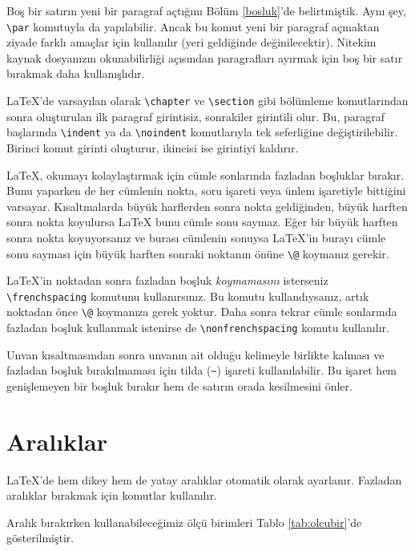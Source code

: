 \documentclass[
  10pt,
]{scrbook}
\theoremstyle{definition}
\theoremstyle{definition}
\theoremstyle{definition}
\theoremstyle{definition}
\theoremstyle{remark}
\begin{document}
Boş bir satırın yeni bir paragraf açtığını Bölüm \ref{bosluk}'de belirtmiştik. Aynı şey, \texttt{\textbackslash{}par} komutuyla da yapılabilir. Ancak bu komut yeni bir paragraf açmaktan ziyade farklı amaçlar için kullanılır (yeri geldiğinde değinilecektir). Nitekim kaynak dosyanızın okunabilirliği açısından paragrafları ayırmak için boş bir satır bırakmak daha kullanışlıdır.

LaTeX'de varsayılan olarak \texttt{\textbackslash{}chapter} ve \texttt{\textbackslash{}section} gibi bölümleme komutlarından sonra oluşturulan ilk paragraf girintisiz, sonrakiler girintili olur. Bu, paragraf başlarında \texttt{\textbackslash{}indent} ya da \texttt{\textbackslash{}noindent} komutlarıyla tek seferliğine değiştirilebilir. Birinci komut girinti oluşturur, ikincisi ise girintiyi kaldırır.

LaTeX, okumayı kolaylaştırmak için cümle sonlarında fazladan boşluklar bırakır. Bunu yaparken de her cümlenin nokta, soru işareti veya ünlem işaretiyle bittiğini varsayar. Kısaltmalarda büyük harflerden sonra nokta geldiğinden, büyük harften sonra nokta koyulursa LaTeX bunu cümle sonu saymaz. Eğer bir büyük harften sonra nokta koyuyorsanız ve burası cümlenin sonuysa LaTeX'in burayı cümle sonu sayması için büyük harften sonraki noktanın önüne \texttt{\textbackslash{}@} koymanız gerekir.

LaTeX'in noktadan sonra fazladan boşluk \emph{koymamasını} isterseniz \texttt{\textbackslash{}frenchspacing} komutunu kullanırsınız. Bu komutu kullandıysanız, artık noktadan önce \texttt{\textbackslash{}@} koymanıza gerek yoktur. Daha sonra tekrar cümle sonlarında fazladan boşluk kullanmak istenirse de \texttt{\textbackslash{}nonfrenchspacing} komutu kullanılır.

Unvan kısaltmasından sonra unvanın ait olduğu kelimeyle birlikte kalması ve fazladan boşluk bırakılmaması için tilda (\texttt{\textasciitilde{}}) işareti kullanılabilir. Bu işaret hem genişlemeyen bir boşluk bırakır hem de satırın orada kesilmesini önler.

\hypertarget{aralux131klar}{%
\section{Aralıklar}\label{aralux131klar}}

LaTeX'de hem dikey hem de yatay aralıklar otomatik olarak ayarlanır. Fazladan aralıklar bırakmak için komutlar kullanılır.

Aralık bırakırken kullanabileceğimiz ölçü birimleri Tablo \ref{tab:olcubir}'de gösterilmiştir.
\end{document}

